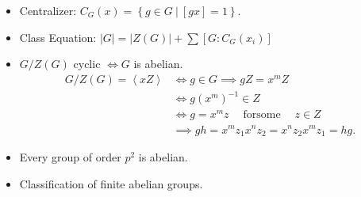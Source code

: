 \begin{concept}

\envlist

\begin{itemize}
\item
  Centralizer:
  \(C_G(x) = \left\{{g\in G {~\mathrel{\Big|}~}[gx] = 1}\right\}\).
\item
  Class Equation:
  \({\left\lvert {G} \right\rvert} = {\left\lvert {Z(G)} \right\rvert} + \sum [G: C_G(x_i)]\)
\item
  \(G/Z(G)\) cyclic \(\iff G\) is abelian.
  \begin{align*}
  G/Z(G) = \left\langle{xZ}\right\rangle 
  &\iff g\in G \implies gZ = x^mZ \\
  &\iff g(x^m)^{-1}\in Z \\
  &\iff g = x^m z {\quad \operatorname{for some} \quad}z\in Z\\
  &\implies gh = x^mz_1 x^n z_2 = x^n z_2 x^m z_1 = hg
  .\end{align*}
\item
  Every group of order \(p^2\) is abelian.
\item
  Classification of finite abelian groups.
\end{itemize}

\end{concept}

